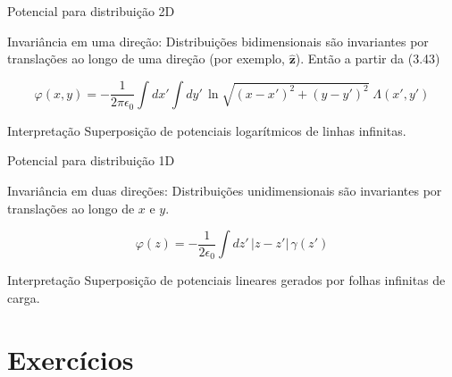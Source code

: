 \documentclass[aspectratio=169,11pt]{beamer}
\begin{document}
\begin{frame}{Potencial para distribuição 2D}

\begin{mybox}{Invariância em uma direção:}
Distribuições bidimensionais são invariantes por translações ao longo de uma direção (por exemplo, \(\hat{\mathbf z}\)). Então a partir da (3.43)
\end{mybox}

\begin{eqbox}
\begin{equation}
\varphi(x,y)
=
-\frac{1}{2\pi\epsilon_0}
\int dx'
\int dy'\,
\ln\sqrt{(x-x')^2+(y-y')^2}\;
\Lambda(x',y')
\tag{3.47}
\end{equation}
\end{eqbox}

\begin{alertblock}{Interpretação}
Superposição de potenciais logarítmicos de linhas infinitas.
\end{alertblock}

\end{frame}

\begin{frame}{Potencial para distribuição 1D }

\begin{mybox}{Invariância em duas direções:}
Distribuições unidimensionais são invariantes por translações ao longo de \(x\) e \(y\).
\end{mybox}

\begin{eqbox}
\begin{equation}
\varphi(z)
=
-\frac{1}{2\epsilon_0}
\int dz'\,
|z-z'|\,
\gamma(z')
\tag{3.48}
\end{equation}
\end{eqbox}

\begin{alertblock}{Interpretação}
Superposição de potenciais lineares gerados por folhas infinitas de carga.
\end{alertblock}

\end{frame}

\section{Exercícios}
\end{document}
